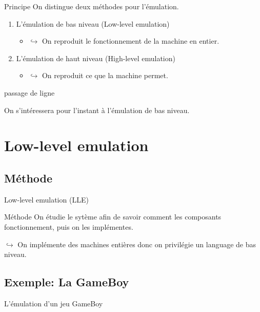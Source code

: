 \documentclass{beamer}
\begin{document}
    \begin{frame}{Principe}
        On distingue deux méthodes pour l'émulation.
        \begin{enumerate}
            \item L'émulation de bas niveau (Low-level emulation)
            \begin{itemize}
                \item[\color{white}] $\hookrightarrow$ On reproduit le fonctionnement de la machine en entier.
            \end{itemize}
            \item L'émulation de haut niveau (High-level emulation)
            \begin{itemize}
                \item[\color{white}] $\hookrightarrow$ On reproduit ce que la machine permet.
            \end{itemize}
        \end{enumerate}
        {\color{white} passage de ligne}

        On s'intéressera pour l'instant à l'émulation de bas niveau.
    \end{frame}

    \section{Low-level emulation}
    \subsection{Méthode}
    \begin{frame}{Low-level emulation (LLE)}
        \begin{exampleblock}{Méthode}
            On étudie le sytème afin de savoir comment les composants fonctionnement, puis on les implémentes.
        \end{exampleblock}
        $\hookrightarrow$ On implémente des machines entières donc on privilégie un language de bas niveau.
    \end{frame}

    \subsection{Exemple: La GameBoy}
    \begin{frame}{L'émulation d'un jeu GameBoy}
        
    \end{frame}
\end{document}
